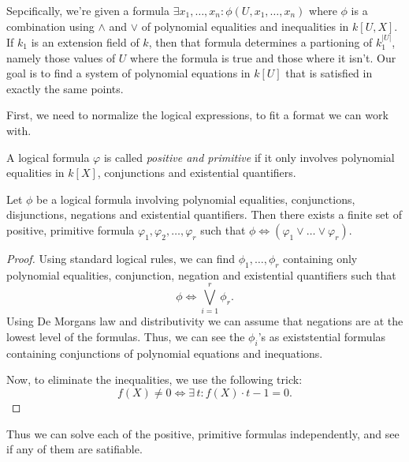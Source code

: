 \documentclass[a4paper, 12pt]{article}
\theoremstyle{changedot}
\theoremstyle{changedotbreak}
\theoremstyle{nonumberplain}
\newtheorem{proof}{Proof}
\begin{document}
Sepcifically, we're given a formula $\exists x_{1}, \dots, x_{n} : \phi(U, x_{1}, \dots, x_{n})$ where $\phi$ is a combination using $\land$ and $\lor$ of polynomial equalities and inequalities in $k[U, X]$. If $k_{1}$ is an extension field of $k$, then that formula determines a partioning of $k_{1}^{|U|}$, namely those values of $U$ where the formula is true and those where it isn't. Our goal is to find a system of polynomial equations in $k[U]$ that is satisfied in exactly the same points.

First, we need to normalize the logical expressions, to fit a format we can work with.

\begin{definition}
  A logical formula $\varphi$ is called \textit{positive and primitive} if it only involves polynomial equalities in $k[X]$, conjunctions and existential quantifiers.
\end{definition}

\begin{lemma}\label{lem:logical_positive}
  Let $\phi$ be a logical formula involving polynomial equalities, conjunctions, disjunctions, negations and existential quantifiers. Then there exists a finite set of positive, primitive formula $\varphi_{1}, \varphi_{2}, \dots, \varphi_{r}$ such that $\phi \iff (\varphi_{1} \lor \dots \lor \varphi_{r})$.
\end{lemma}
\begin{proof}
  Using standard logical rules, we can find $\phi_{1}, \dots, \phi_{r}$ containing only polynomial equalities, conjunction, negation and existential quantifiers such that \[\phi \iff \bigvee_{i=1}^{r} \phi_{r}.\] Using De Morgans law and distributivity we can assume that negations are at the lowest level of the formulas. Thus, we can see the $\phi_{i}$'s as existstential formulas containing conjunctions of polynomial equations and inequations.

  Now, to eliminate the inequalities, we use the following trick: \[f(X) \neq 0 \iff \exists\, t : f(X) \cdot t - 1 = 0.\]
\end{proof}

Thus we can solve each of the positive, primitive formulas independently, and see if any of them are satifiable.
\end{document}
